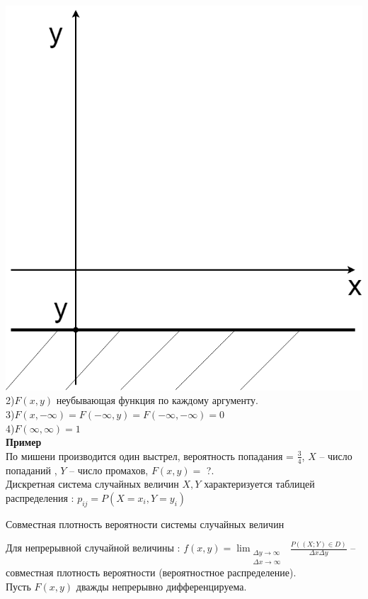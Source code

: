 \documentclass[russian, 12pt, fleqn]{article}
\begin{document}
\includegraphics[scale=0.3]{pg30num3.png}\\	
2)$F(x, y)$ неубывающая функция по каждому аргументу.\\
3)$F(x, -\infty) = F(-\infty, y) = F(-\infty, -\infty) = 0$\\
4)$F(\infty, \infty) = 1$\\
\textbf{Пример}\\
По мишени производится один выстрел, вероятность попадания = $\frac{3}{4}$, $X$ --  число попаданий , $Y$ -- число промахов, $F(x, y)=$ ?.\\
Дискретная система случайных величин $X,Y$ характеризуется таблицей распределения : $p_{ij} = P(X=x_i, Y = y_i)$
\begin{center}
$\textbf{Совместная плотность вероятности системы случайных величин}$
\end{center}
Для непрерывной случайной величины : $f(x, y) =  \displaystyle{  \lim_{\substack{{\Delta y\to{\infty}}\\
												        {\Delta x\to{\infty}}}}}$
$\frac{P((X;Y)\in D)}{\Delta x \Delta y}$ -- совместная плотность вероятности (вероятностное распределение).\\
Пусть $F(x, y)$ дважды непрерывно дифференцируема. \\
\end{document}
